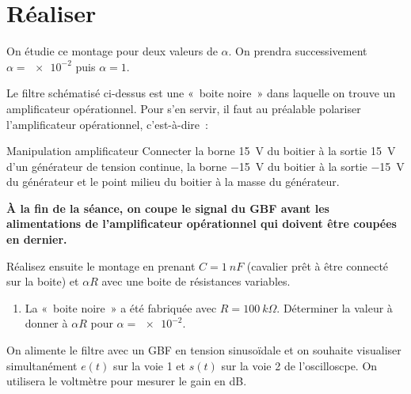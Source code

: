 \documentclass[a4paper, 11pt, final, garamond]{book}
\begin{document}
\section{Réaliser}

On étudie ce montage pour deux valeurs de $\alpha$. On prendra successivement
$\alpha=\num{e-2}$ puis $\alpha=1$.

Le filtre schématisé ci-dessus est une «~boite noire~» dans laquelle on trouve
un amplificateur opérationnel. Pour s'en servir, il faut au préalable polariser
l'amplificateur opérationnel, c'est-à-dire~:

\begin{instruc}{Manipulation amplificateur}
    Connecter la borne \SI{+15}{V} du boitier à la sortie \SI{+15}{V} d'un
    générateur de tension continue, la borne \SI{-15}{V} du boitier à la sortie
    \SI{-15}{V} du générateur et le point milieu du boitier à la masse du
    générateur.
\end{instruc}

\begin{bror}{}
    \centering\bfseries
    À la fin de la séance, on coupe le signal du GBF avant les alimentations de
    l'amplificateur opérationnel qui doivent être coupées en dernier.
\end{bror}

Réalisez ensuite le montage en prenant $C=\SI{1}{nF}$ (cavalier prêt à être
connecté sur la boite) et $\alpha R$ avec une boite de résistances variables.
\bigbreak

\begin{enumerate}[resume, label=\sqenumi]
    \item La «~boite noire~» a été fabriquée avec $R= \SI{100}{k\Omega}$.
        Déterminer la valeur à donner à $\alpha R$ pour $\alpha=\num{e-2}$. 
\end{enumerate}

\bigbreak
On alimente le filtre avec un GBF en tension sinusoïdale et on souhaite
visualiser simultanément $e(t)$ sur la voie 1 et $s(t)$ sur la voie 2 de
l'oscilloscpe. On utilisera le voltmètre pour mesurer le gain en dB. \bigbreak
\end{document}
